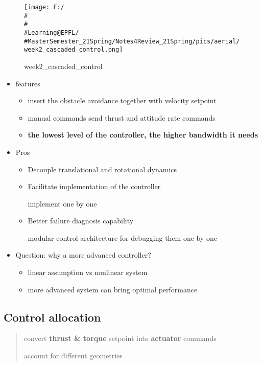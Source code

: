\documentclass[]{article}
\begin{document}
\begin{figure}
\centering
\texttt{[image: F:/\\\#\\\#\\\#Learning@EPFL/\\\#MasterSemester\_21Spring/Notes4Review\_21Spring/pics/aerial/week2\_cascaded\_control.png]}
\caption{week2\_cascaded\_control}
\end{figure}

\begin{itemize}
\item
  features

  \begin{itemize}
  \item
    insert the obstacle avoidance together with velocity setpoint
  \item
    manual commands send thrust and attitude rate commands
  \item
    \textbf{the lowest level of the controller, the higher bandwidth it
    needs}
  \end{itemize}
\item
  Pros

  \begin{itemize}
  \item
    Decouple translational and rotational dynamics
  \item
    Facilitate implementation of the controller

    implement one by one
  \item
    Better failure diagnosis capability

    modular control architecture for debugging them one by one
  \end{itemize}
\item
  Question: why a more advanced controller?

  \begin{itemize}
  \item
    linear assumption vs nonlinear system
  \item
    more advanced system can bring optimal performance
  \end{itemize}
\end{itemize}

\subsection{Control allocation}\label{header-n616}

\begin{quote}
convert \textbf{thrust \& torque} setpoint into \textbf{actuator}
commands

account for different geometries
\end{quote}
\end{document}
